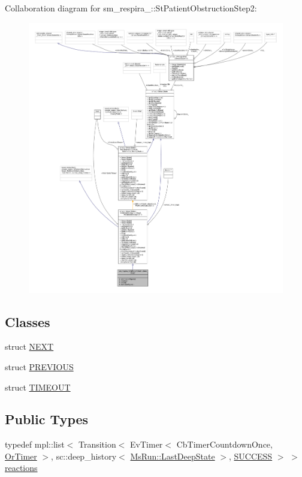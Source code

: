 Collaboration diagram for sm\+\_\+respira\+\_\+:\+:St\+Patient\+Obstruction\+Step2\+:
\nopagebreak
\begin{figure}[H]
\begin{center}
\leavevmode
\includegraphics[width=350pt]{structsm__respira__1_1_1StPatientObstructionStep2__coll__graph}
\end{center}
\end{figure}
\subsection*{Classes}
\begin{DoxyCompactItemize}
\item 
struct \hyperlink{structsm__respira__1_1_1StPatientObstructionStep2_1_1NEXT}{N\+E\+XT}
\item 
struct \hyperlink{structsm__respira__1_1_1StPatientObstructionStep2_1_1PREVIOUS}{P\+R\+E\+V\+I\+O\+US}
\item 
struct \hyperlink{structsm__respira__1_1_1StPatientObstructionStep2_1_1TIMEOUT}{T\+I\+M\+E\+O\+UT}
\end{DoxyCompactItemize}
\subsection*{Public Types}
\begin{DoxyCompactItemize}
\item 
typedef mpl\+::list$<$ Transition$<$ Ev\+Timer$<$ Cb\+Timer\+Countdown\+Once, \hyperlink{classsm__respira__1_1_1OrTimer}{Or\+Timer} $>$, sc\+::deep\+\_\+history$<$ \hyperlink{classsmacc_1_1SmaccState_a60088405d2d99d468caa0baa3b2830a8}{Ms\+Run\+::\+Last\+Deep\+State} $>$, \hyperlink{classSUCCESS}{S\+U\+C\+C\+E\+SS} $>$ $>$ \hyperlink{structsm__respira__1_1_1StPatientObstructionStep2_a24a90978e9c1965e54f3dcb958c4b302}{reactions}
\end{DoxyCompactItemize}
